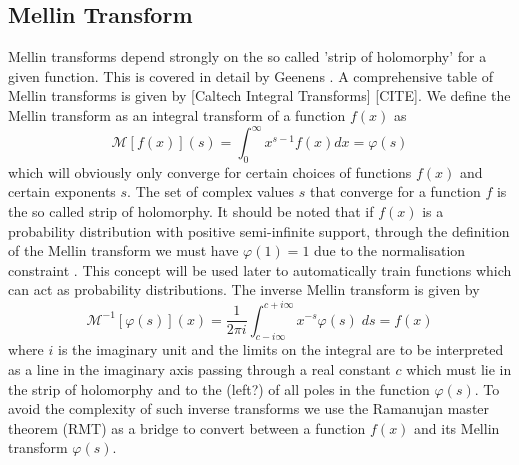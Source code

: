 \documentclass{article}
\begin{document}
\subsection{Mellin Transform}
Mellin transforms depend strongly on the so called 'strip of holomorphy' for a given function. This is covered in detail by Geenens \citep{Geenens2017}. A comprehensive table of Mellin transforms is given by [Caltech Integral Transforms] [CITE]. We define the Mellin transform as an integral transform of a function $f(x)$ as
\begin{equation}
\mathcal{M}[f(x)](s) = \int_0^\infty x^{s-1}f(x) dx = \varphi(s)
\end{equation}
which will obviously only converge for certain choices of functions $f(x)$ and certain exponents $s$. The set of complex values $s$ that converge for a function $f$ is the so called strip of holomorphy. It should be noted that if $f(x)$ is a probability distribution with positive semi-infinite support, through the definition of the Mellin transform we must have $\varphi(1)=1$ due to the normalisation constraint \citep{Geenens2017}. This concept will be used later to automatically train functions which can act as probability distributions. The inverse Mellin transform is given by
\begin{equation}
\mathcal{M}^{-1}[\varphi(s)](x) = \frac{1}{2 \pi i}\int_{c- i \infty}^{c + i \infty} x^{-s} \varphi(s) \; ds = f(x)
\label{eqn:InverseMT}
\end{equation}
where $i$ is the imaginary unit and the limits on the integral are to be interpreted as a line in the imaginary axis passing through a real constant $c$ which must lie in the strip of holomorphy and to the {\color{red}(left?)} of all poles in the function $\varphi(s)$. To avoid the complexity of such inverse transforms we use the Ramanujan master theorem (RMT) as a bridge to convert between a function $f(x)$ and its Mellin transform $\varphi(s)$.
\end{document}
